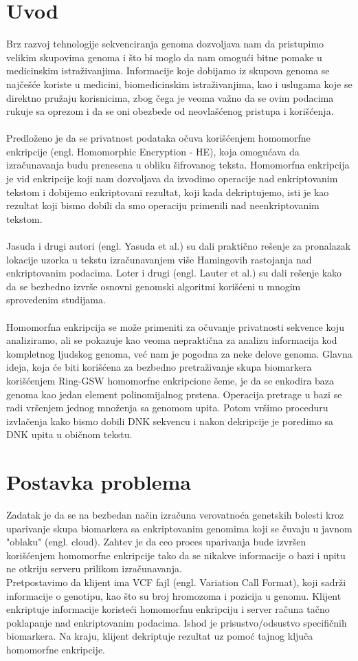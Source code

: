 \documentclass[a4paper]{article}
\begin{document}
\section{Uvod}
\label{sec:uvod}
Brz razvoj tehnologije sekvenciranja genoma dozvoljava nam da pristupimo velikim skupovima genoma i što bi moglo da nam omogući bitne pomake u medicinskim istraživanjima. Informacije koje dobijamo iz skupova genoma se najčešće koriste u medicini, biomedicinskim istraživanjima, kao i uslugama koje se direktno pružaju korisnicima, zbog čega je veoma važno da se ovim podacima rukuje sa oprezom i da se oni obezbede od neovlašćenog pristupa i korišćenja.\\\\
Predloženo je da se privatnost podataka očuva korišćenjem homomorfne enkripcije (engl. Homomorphic Encryption - HE), koja omogućava da izračunavanja budu prenesena u obliku šifrovanog teksta.
Homomorfna enkripcija je vid enkripcije koji nam dozvoljava da izvodimo operacije nad enkriptovanim tekstom i dobijemo enkriptovani rezultat, koji kada dekriptujemo, isti je kao rezultat koji bismo dobili da smo operaciju primenili nad neenkriptovanim tekstom.\\\\ Jasuda i drugi autori (engl. Yasuda et al.) su dali praktično rešenje za pronalazak lokacije uzorka u tekstu izračunavanjem više Hamingovih rastojanja nad enkriptovanim podacima. Loter i drugi (engl. Lauter et al.) su dali rešenje kako da se bezbedno izvrše osnovni genomski algoritmi korišćeni u mnogim sprovedenim studijama.\\\\
Homomorfna enkripcija se može primeniti za očuvanje privatnosti sekvence koju analiziramo, ali se pokazuje kao veoma nepraktična za analizu informacija kod kompletnog ljudskog genoma, već nam je pogodna za neke delove genoma.
Glavna ideja, koja će biti korišćena za bezbedno pretraživanje skupa biomarkera korišćenjem Ring-GSW homomorfne enkripcione šeme, je da se enkodira baza genoma kao jedan element polinomijalnog prstena. Operacija pretrage u bazi se radi vršenjem jednog množenja sa genomom upita. Potom vršimo proceduru izvlačenja kako bismo dobili DNK sekvencu i nakon dekripcije je poredimo sa DNK upita u običnom tekstu. 

\section{Postavka problema}
Zadatak je da se na bezbedan način izračuna verovatnoća genetskih bolesti kroz uparivanje skupa biomarkera sa enkriptovanim genomima koji se čuvaju u javnom "oblaku" (engl. cloud). Zahtev je da ceo proces uparivanja bude izvršen korišćenjem homomorfne enkripcije tako da se nikakve informacije o bazi i upitu ne otkriju serveru prilikom izračunavanja.\\
Pretpostavimo da klijent ima VCF fajl (engl. Variation Call Format), koji sadrži informacije o genotipu, kao što su broj hromozoma i pozicija u genomu. Klijent enkriptuje informacije koristeći homomorfnu enkripciju i server računa tačno poklapanje nad enkriptovanim podacima. Ishod je prisustvo/odsustvo specifičnih biomarkera. Na kraju, klijent dekriptuje rezultat uz pomoć tajnog ključa homomorfne enkripcije.
\end{document}
